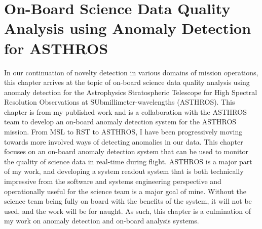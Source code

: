 \chapter[On-Board Science Data Quality Analysis using Anomaly Detection for ASTHROS]{On-Board Science Data Quality Analysis using Anomaly Detection for ASTHROS}
\label{ch:spectra}
In our continuation of novelty detection in various domains of mission operations, this chapter arrives at the topic of on-board science data quality analysis using anomaly detection for the Astrophysics Stratospheric Telescope for High Spectral Resolution Observations at SUbmillimeter-wavelengths (ASTHROS).
This chapter is from my published work \cite{horton2024board} and is a collaboration with the ASTHROS team to develop an on-board anomaly detection system for the ASTHROS mission.
From MSL to RST to ASTHROS, I have been progressively moving towards more involved ways of detecting anomalies in our data.
This chapter focuses on an on-board anomaly detection system that can be used to monitor the quality of science data in real-time during flight.
ASTHROS is a major part of my work, and developing a system readout system that is both technically impressive from the software and systems engineering perspective and operationally useful for the science team is a major goal of mine.
Without the science team being fully on board with the benefits of the system, it will not be used, and the work will be for naught.
As such, this chapter is a culmination of my work on anomaly detection and on-board analysis systems.

